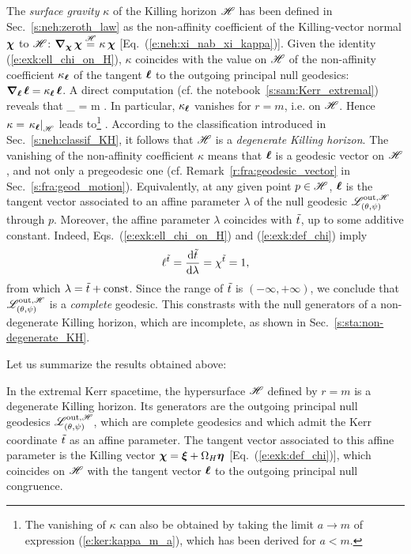 The \emph{surface gravity} $\kappa$ of the Killing horizon $\mathscr{H}$
has been defined in Sec.~\ref{s:neh:zeroth_law} as the non-affinity coefficient of the Killing-vector normal $\bm{\chi}$ to $\mathscr{H}$:
$\bm{\nabla}_{\bm{\chi}}\, \bm{\chi} \stackrel{\mathscr{H}}{=} \kappa \, \bm{\chi}$ [Eq.~(\ref{e:neh:xi_nab_xi_kappa})].
Given the identity (\ref{e:exk:ell_chi_on_H}), $\kappa$ coincides with the value on $\mathscr{H}$ of the
non-affinity coefficient $\kappa_{\bm{\ell}}$ of the tangent $\bm{\ell}$ to the outgoing principal null
geodesics: $\bm{\nabla}_{\bm{\ell}}\, \bm{\ell} = \kappa_{\bm{\ell}}\, \bm{\ell}$. A direct computation (cf. the notebook~\ref{s:sam:Kerr_extremal}) reveals that
\be
    \kappa_{\wl} = m  .
\ee
In particular, $\kappa_{\bm{\ell}}$ vanishes for $r=m$, i.e. on $\mathscr{H}$.
Hence $\kappa = \left. \kappa_{\bm{\ell}} \right| _{\mathscr{H}}$ leads to\footnote{The vanishing of $\kappa$ can also be obtained
by taking the limit $a\to m$ of expression (\ref{e:ker:kappa_m_a}), which has been derived for $a<m$.}
\be
     .
\ee
According to the classification introduced in Sec.~\ref{s:neh:classif_KH}, it follows
that $\mathscr{H}$ is a \emph{degenerate Killing horizon}.
The vanishing of the non-affinity coefficient $\kappa$ means that $\bm{\ell}$ is a geodesic vector
on $\mathscr{H}$, and not only a pregeodesic  one (cf. Remark~\ref{r:fra:geodesic_vector} in Sec.~\ref{s:fra:geod_motion}). Equivalently, at any given point $p\in\mathscr{H}$,
$\bm{\ell}$ is the tangent vector associated to
an affine parameter $\lambda$ of the null geodesic $\mathscr{L}^{{\rm out},\mathscr{H}}_{(\theta,\psi)}$ through $p$.
Moreover, the affine parameter $\lambda$ coincides with ${\tilde t}$,
up to some additive constant. Indeed,
Eqs.~(\ref{e:exk:ell_chi_on_H}) and (\ref{e:exk:def_chi}) imply
\[
     \ell^{{\tilde t}} = \frac{\mathrm{d} {\tilde t}}{\mathrm{d} \lambda} = \chi^{{\tilde t}} = 1 ,
\]
from which $\lambda = {\tilde t} + \mathrm{const}$.
Since the range of ${\tilde t}$ is $(-\infty, +\infty)$, we conclude that
$\mathscr{L}^{{\rm out},\mathscr{H}}_{(\theta,\psi)}$ is a \emph{complete} geodesic. This constrasts
with the null generators of a non-degenerate Killing horizon, which are
incomplete, as shown in Sec.~\ref{s:sta:non-degenerate_KH}.

Let us summarize the results obtained above:
\begin{greybox}
In the extremal Kerr spacetime, the hypersurface $\mathscr{H}$ defined
by $r=m$ is a degenerate Killing horizon.
Its generators are the outgoing principal null geodesics
$\mathscr{L}^{{\rm out},\mathscr{H}}_{(\theta,\psi)}$, which are complete geodesics
and which admit the Kerr coordinate
${\tilde t}$ as an affine parameter. The tangent vector associated to this affine
parameter is the Killing vector $\bm{\chi} = \bm{\xi} + \Omega_H \bm{\eta}$
[Eq.~(\ref{e:exk:def_chi})], which coincides on $\mathscr{H}$ with the tangent
vector $\bm{\ell}$ to the outgoing principal null congruence.
\end{greybox}

